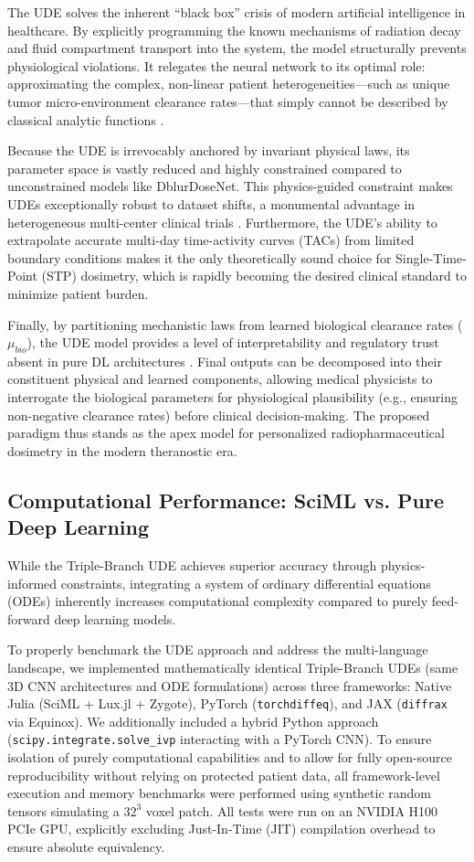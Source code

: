 \documentclass[a4paper,10pt]{elsarticle}
\begin{document}
The UDE solves the inherent ``black box'' crisis of modern artificial intelligence in healthcare. By explicitly programming the known mechanisms of radiation decay and fluid compartment transport into the system, the model structurally prevents physiological violations. It relegates the neural network to its optimal role: approximating the complex, non-linear patient heterogeneities—such as unique tumor micro-environment clearance rates—that simply cannot be described by classical analytic functions  \cite{AkhavanallafShiri2020}. 

Because the UDE is irrevocably anchored by invariant physical laws, its parameter space is vastly reduced and highly constrained compared to unconstrained models like DblurDoseNet. This physics-guided constraint makes UDEs exceptionally robust to dataset shifts, a monumental advantage in heterogeneous multi-center clinical trials  \cite{XueGafita2024}. Furthermore, the UDE's ability to extrapolate accurate multi-day time-activity curves (TACs) from limited boundary conditions makes it the only theoretically sound choice for Single-Time-Point (STP) dosimetry, which is rapidly becoming the desired clinical standard to minimize patient burden. 

Finally, by partitioning mechanistic laws from learned biological clearance rates ($\mu_{bio}$), the UDE model provides a level of interpretability and regulatory trust absent in pure DL architectures  \cite{AkhavanallafShiri2020}. Final outputs can be decomposed into their constituent physical and learned components, allowing medical physicists to interrogate the biological parameters for physiological plausibility (e.g., ensuring non-negative clearance rates) before clinical decision-making. The proposed paradigm thus stands as the apex model for personalized radiopharmaceutical dosimetry in the modern theranostic era.


\subsection{Computational Performance: SciML vs. Pure Deep Learning}
While the Triple-Branch UDE achieves superior accuracy through physics-informed constraints, integrating a system of ordinary differential equations (ODEs) inherently increases computational complexity compared to purely feed-forward deep learning models. 

To properly benchmark the UDE approach and address the multi-language landscape, we implemented mathematically identical Triple-Branch UDEs (same 3D CNN architectures and ODE formulations) across three frameworks: Native Julia (SciML + Lux.jl + Zygote), PyTorch (\texttt{torchdiffeq}), and JAX (\texttt{diffrax} via Equinox). We additionally included a hybrid Python approach (\texttt{scipy.integrate.solve\_ivp} interacting with a PyTorch CNN). To ensure isolation of purely computational capabilities and to allow for fully open-source reproducibility without relying on protected patient data, all framework-level execution and memory benchmarks were performed using synthetic random tensors simulating a $32^3$ voxel patch. All tests were run on an NVIDIA H100 PCIe GPU, explicitly excluding Just-In-Time (JIT) compilation overhead to ensure absolute equivalency.
\end{document}
